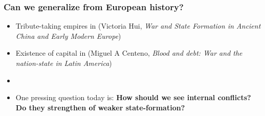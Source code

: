 \documentclass[aspectratio=43, handout]{beamer}
\begin{document}
\begin{frame}
\frametitle{Can we generalize from European history?}
\centering

\begin{itemize}[<+->]
  \item Tribute-taking empires in  (Victoria Hui, \textit{War and State Formation in Ancient China and Early Modern Europe})
  \item Existence of capital in  (Miguel A Centeno, \textit{Blood and debt: War and the nation-state in Latin America})
  \item[]
  \item One pressing question today is: \textbf{How should we see internal conflicts? Do they strengthen of weaker state-formation?}
\end{itemize}

\end{frame}
\end{document}
